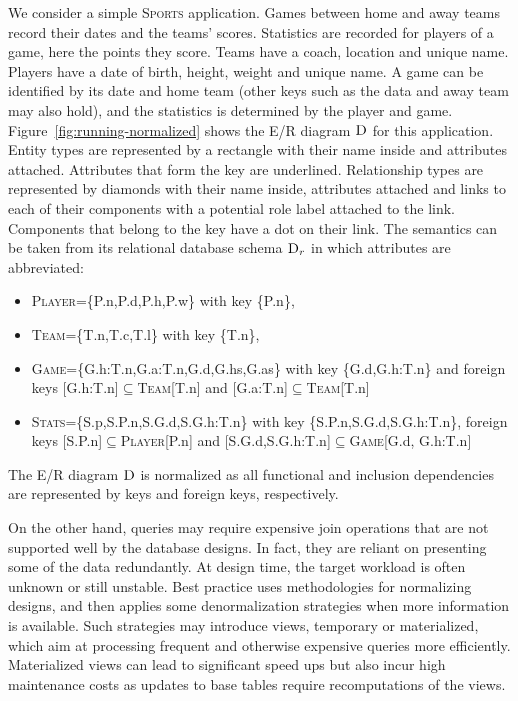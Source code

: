 \documentclass[sigconf]{acmart}
\begin{document}
\begin{example} We consider a simple \textsc{Sports} application. Games between home and away teams record their dates and the teams' scores. Statistics are recorded for players of a game, here the points they score. Teams have a coach, location and unique name. Players have a date of birth, height, weight and unique name. A game can be identified by its date and home team (other keys such as the data and away team may also hold), and the statistics is determined by the player and game. Figure~\ref{fig:running-normalized} shows the E/R diagram $\textsc{D}$ for this application. Entity types are represented by a rectangle with their name inside and attributes attached. Attributes that form the key are underlined. Relationship types are represented by diamonds with their name inside, attributes attached and links to each of their components with a potential role label attached to the link. Components that belong to the key have a dot on their link. The semantics can be taken from its relational database schema $\textsc{D}_r$ in which attributes are abbreviated:
\begin{itemize}\small
\item \textsc{Player}=\{P.n,P.d,P.h,P.w\} with key \{P.n\},
\item \textsc{Team}=\{T.n,T.c,T.l\} with key \{T.n\},
\item \textsc{Game}=\{G.h:T.n,G.a:T.n,G.d,G.hs,G.as\} with key \{G.d,G.h:T.n\} and foreign keys {[}G.h:T.n{]}$\subseteq$\textsc{Team}{[}T.n{]} and {[}G.a:T.n{]}$\subseteq$\textsc{Team}{[}T.n{]}
\item \textsc{Stats}=\{S.p,S.P.n,S.G.d,S.G.h:T.n\} with key \{S.P.n,S.G.d,S.G.h:T.n\}, foreign keys {[}S.P.n{]}$\subseteq$\textsc{Player}{[}P.n{]} and {[}S.G.d,S.G.h:T.n{]}$\subseteq$\textsc{Game}{[}G.d, G.h:T.n{]}
\end{itemize}
The E/R diagram $\textsc{D}$ is normalized as all functional and inclusion dependencies are represented by keys and foreign keys, respectively.
\end{example}

On the other hand, queries may require expensive join operations that are not supported well by the database designs. In fact, they are reliant on presenting some of the data redundantly. At design time, the target workload is often unknown or still unstable. Best practice uses methodologies for normalizing designs, and then applies some denormalization strategies when more information is available. Such strategies may introduce views, temporary or materialized, which aim at processing frequent and otherwise expensive queries more efficiently. Materialized views can lead to significant speed ups but also incur high maintenance costs as updates to base tables require recomputations of the views.
\end{document}
